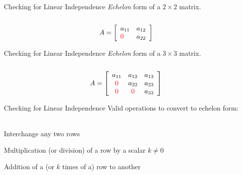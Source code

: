 \documentclass{./../../Latex/teaching_slides}
\begin{document}
\begin{frame}{Checking for Linear Independence}
\textit{Echelon} form of a $2 \times 2$ matrix. \\~\\
$$
A=\left[\begin{array}{ll}
a_{11} & a_{12} \\
\textcolor{red}{0} & a_{22}
\end{array}\right]
$$
\end{frame}

\begin{frame}{Checking for Linear Independence}
\textit{Echelon} form of a $3 \times 3$ matrix. \\~\\
$$
A=\left[\begin{array}{ccc}
a_{11} & a_{12} & a_{13} \\
\textcolor{red}{0} & a_{22} & a_{23}  \\
\textcolor{red}{0} & \textcolor{red}{0} & a_{33}
\end{array}\right]
$$
\end{frame}

\begin{frame}{Checking for Linear Independence}
Valid operations to convert to echelon form:\\~\\
\begin{witemize}
\item Interchange any two rows
\item Multiplication (or division) of a row by a scalar $k \neq 0$
\item Addition of a (or $k$ times of a) row to another \\~\\
\end{witemize}
\end{frame}
\end{document}
